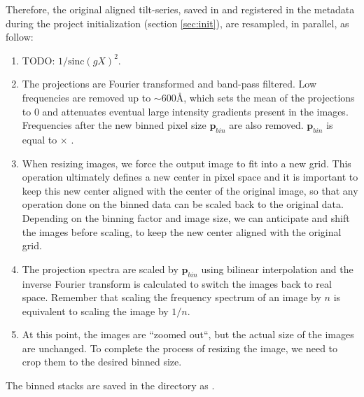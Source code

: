 Therefore, the original aligned tilt-series, saved in  and registered in the metadata during the project initialization (section \ref{sec:init}), are resampled, in parallel, as follow:
\begin{enumerate}
    \item TODO: $1/{\mathrm{sinc}(gX)}^2$.

    \item The projections are Fourier transformed and band-pass filtered. Low frequencies are removed up to $\sim$600\si{\angstrom}, which sets the mean of the projections to 0 and attenuates eventual large intensity gradients present in the images. Frequencies after the new binned pixel size $\bm{p}_{bin}$ are also removed.  $\bm{p}_{bin}$ is equal to  $\times$ .

    \item When resizing images, we force the output image to fit into a new grid. This operation ultimately defines a new center in pixel space and it is important to keep this new center aligned with the center of the original image, so that any operation done on the binned data can be scaled back to the original data. Depending on the binning factor and image size, we can anticipate and shift the images before scaling, to keep the new center aligned with the original grid.

    \item The projection spectra are scaled by $\bm{p}_{bin}$ using bilinear interpolation and the inverse Fourier transform is calculated to switch the images back to real space. Remember that scaling the frequency spectrum of an image by $n$ is equivalent to scaling the image by $1/n$.

    \item At this point, the images are ``zoomed out``, but the actual size of the images are unchanged. To complete the process of resizing the image, we need to crop them to the desired binned size.
\end{enumerate}

The binned stacks are saved in the  directory as .


